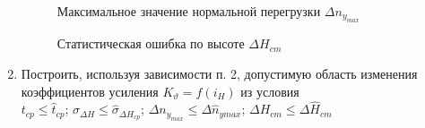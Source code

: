 \documentclass[a4paper,12pt]{article}
\begin{document}
\begin{enumerate}
    \begin{figure}[H]
        \caption{Максимальное значение нормальной перегрузки $\Delta n_{y_{max}}$}
        \label{fig:Максимальное значение нормальной перегрузки}
    \end{figure}
    
    \begin{figure}[H]
        \caption{Статистическая ошибка по высоте $\Delta H_{cm}$}
        \label{fig:Статистическая ошибка по высоте}
    \end{figure}


    \item Построить, используя зависимости п. 2, допустимую область изменения коэффициентов усиления $K_{\vartheta}=f(i_H)$ из условия \\ $t_{cp} \leq \hat{t}_{cp}$; $\sigma_{\Delta H} \leq \hat{\sigma}_{\Delta H_{cp}}$;
    $\Delta n_{y_{max}} \leq \Delta \hat{n}_{y{max}}$; $\Delta H_{cm} \leq \Delta \hat{H}_{cm}$  


\end{enumerate}
\end{document}
